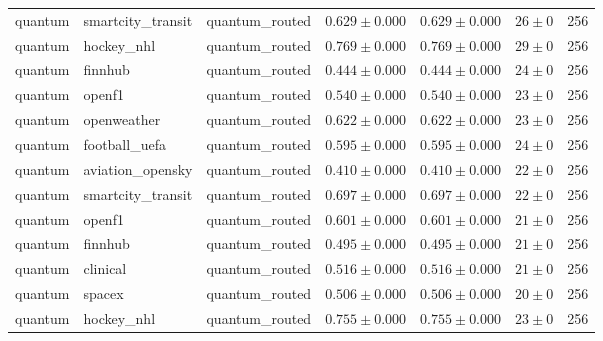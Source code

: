 \begin{table}[htbp]
\begin{tabular}{l l l r r r r}
quantum & smartcity\_transit & quantum\_routed & $0.629\pm0.000$ & $0.629\pm0.000$ & $26\pm0$ & 256 \\
quantum & hockey\_nhl & quantum\_routed & $0.769\pm0.000$ & $0.769\pm0.000$ & $29\pm0$ & 256 \\
quantum & finnhub & quantum\_routed & $0.444\pm0.000$ & $0.444\pm0.000$ & $24\pm0$ & 256 \\
quantum & openf1 & quantum\_routed & $0.540\pm0.000$ & $0.540\pm0.000$ & $23\pm0$ & 256 \\
quantum & openweather & quantum\_routed & $0.622\pm0.000$ & $0.622\pm0.000$ & $23\pm0$ & 256 \\
quantum & football\_uefa & quantum\_routed & $0.595\pm0.000$ & $0.595\pm0.000$ & $24\pm0$ & 256 \\
quantum & aviation\_opensky & quantum\_routed & $0.410\pm0.000$ & $0.410\pm0.000$ & $22\pm0$ & 256 \\
quantum & smartcity\_transit & quantum\_routed & $0.697\pm0.000$ & $0.697\pm0.000$ & $22\pm0$ & 256 \\
quantum & openf1 & quantum\_routed & $0.601\pm0.000$ & $0.601\pm0.000$ & $21\pm0$ & 256 \\
quantum & finnhub & quantum\_routed & $0.495\pm0.000$ & $0.495\pm0.000$ & $21\pm0$ & 256 \\
quantum & clinical & quantum\_routed & $0.516\pm0.000$ & $0.516\pm0.000$ & $21\pm0$ & 256 \\
quantum & spacex & quantum\_routed & $0.506\pm0.000$ & $0.506\pm0.000$ & $20\pm0$ & 256 \\
quantum & hockey\_nhl & quantum\_routed & $0.755\pm0.000$ & $0.755\pm0.000$ & $23\pm0$ & 256 \\
\hline
\end{tabular}
\end{table}
